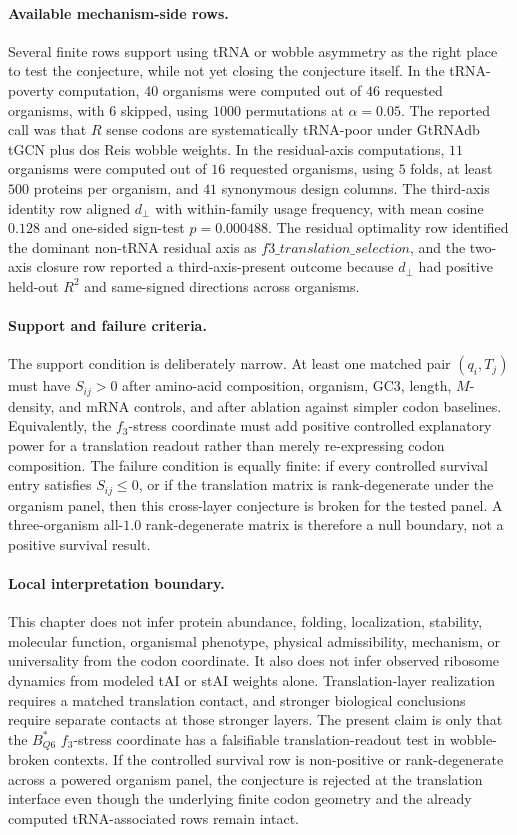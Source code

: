 \paragraph{Available mechanism-side rows.}
Several finite rows support using tRNA or wobble asymmetry as the right place to test the conjecture, while not yet closing the conjecture itself.  In the tRNA-poverty computation, $40$ organisms were computed out of $46$ requested organisms, with $6$ skipped, using $1000$ permutations at $\alpha=0.05$.  The reported call was that $R$ sense codons are systematically tRNA-poor under GtRNAdb tGCN plus dos Reis wobble weights.  In the residual-axis computations, $11$ organisms were computed out of $16$ requested organisms, using $5$ folds, at least $500$ proteins per organism, and $41$ synonymous design columns.  The third-axis identity row aligned $d_{\perp}$ with within-family usage frequency, with mean cosine $0.128$ and one-sided sign-test $p=0.000488$.  The residual optimality row identified the dominant non-tRNA residual axis as $f3\_translation\_selection$, and the two-axis closure row reported a third-axis-present outcome because $d_{\perp}$ had positive held-out $R^2$ and same-signed directions across organisms.

\paragraph{Support and failure criteria.}
The support condition is deliberately narrow.  At least one matched pair $(q_i,T_j)$ must have $S_{ij}>0$ after amino-acid composition, organism, GC3, length, $M$-density, and mRNA controls, and after ablation against simpler codon baselines.  Equivalently, the $f_3$-stress coordinate must add positive controlled explanatory power for a translation readout rather than merely re-expressing codon composition.  The failure condition is equally finite: if every controlled survival entry satisfies $S_{ij}\leq 0$, or if the translation matrix is rank-degenerate under the organism panel, then this cross-layer conjecture is broken for the tested panel.  A three-organism all-$1.0$ rank-degenerate matrix is therefore a null boundary, not a positive survival result.

\paragraph{Local interpretation boundary.}
This chapter does not infer protein abundance, folding, localization, stability, molecular function, organismal phenotype, physical admissibility, mechanism, or universality from the codon coordinate.  It also does not infer observed ribosome dynamics from modeled tAI or stAI weights alone.  Translation-layer realization requires a matched translation contact, and stronger biological conclusions require separate contacts at those stronger layers.  The present claim is only that the $B^{*}_{Q6}$ $f_3$-stress coordinate has a falsifiable translation-readout test in wobble-broken contexts.  If the controlled survival row is non-positive or rank-degenerate across a powered organism panel, the conjecture is rejected at the translation interface even though the underlying finite codon geometry and the already computed tRNA-associated rows remain intact.
